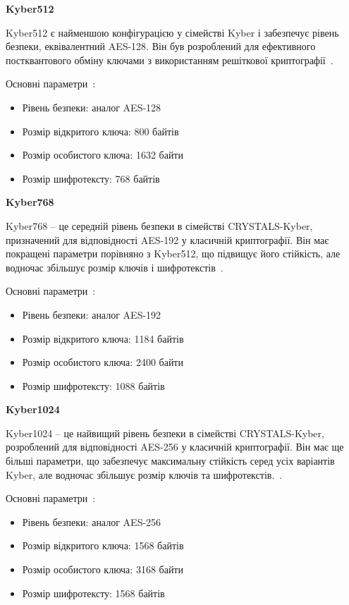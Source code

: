 \textbf{Kyber512}

Kyber512 є найменшою конфігурацією у сімействі Kyber і забезпечує рівень безпеки, еквівалентний AES-128. Він був розроблений для ефективного постквантового обміну ключами з використанням решіткової криптографії~\cite{KyberWebsite}.

Основні параметри~\cite{KyberWebsite}:
\begin{itemize}
    \item Рівень безпеки: аналог AES-128
    \item Розмір відкритого ключа: 800 байтів
    \item Розмір особистого ключа: 1632 байти
    \item Розмір шифротексту: 768 байтів
\end{itemize}

\textbf{Kyber768}

Kyber768 – це середній рівень безпеки в сімействі CRYSTALS-Kyber, призначений для відповідності AES-192 у класичній криптографії. Він має покращені параметри порівняно з Kyber512, що підвищує його стійкість, але водночас збільшує розмір ключів і шифротекстів~\cite{KyberWebsite}.

Основні параметри~\cite{KyberWebsite}:
\begin{itemize}
    \item Рівень безпеки: аналог AES-192
    \item Розмір відкритого ключа: 1184 байтів
    \item Розмір особистого ключа: 2400 байти
    \item Розмір шифротексту: 1088 байтів
\end{itemize}

\textbf{Kyber1024}

Kyber1024 – це найвищий рівень безпеки в сімействі CRYSTALS-Kyber, розроблений для відповідності AES-256 у класичній криптографії. Він має ще більші параметри, що забезпечує максимальну стійкість серед усіх варіантів Kyber, але водночас збільшує розмір ключів та шифротекстів.~\cite{KyberWebsite}.

Основні параметри~\cite{KyberWebsite}:
\begin{itemize}
    \item Рівень безпеки: аналог AES-256
    \item Розмір відкритого ключа: 1568 байтів
    \item Розмір особистого ключа: 3168 байти
    \item Розмір шифротексту: 1568 байтів
\end{itemize}

